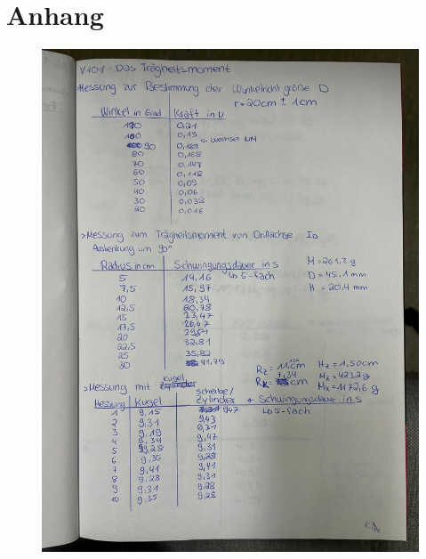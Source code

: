 \section{Anhang}
\label{sec:Anhang}
\begin{figure}
    \centering
    \includegraphics[width=\textwidth]{Messdaten/Daten1.jpg}
\end{figure}
